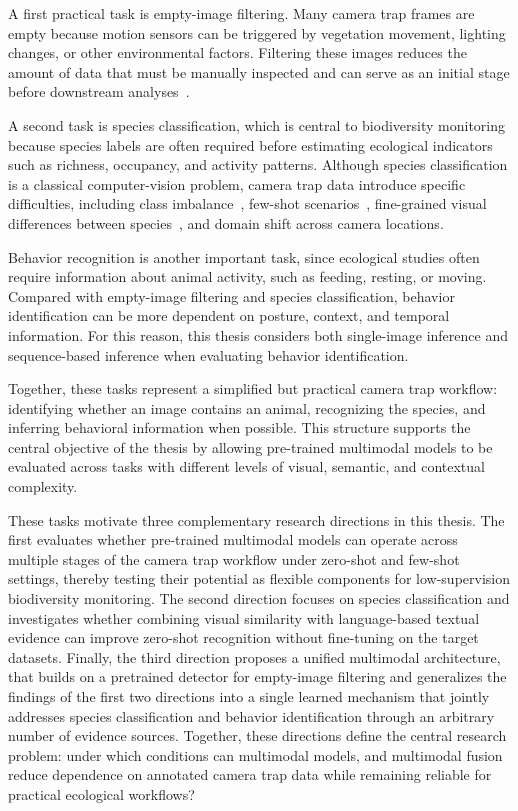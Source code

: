 A first practical task is empty-image filtering. Many camera trap frames are empty because motion sensors can be triggered by vegetation movement, lighting changes, or other environmental factors. Filtering these images reduces the amount of data that must be manually inspected and can serve as an initial stage before downstream analyses~\citep{beery2019efficient, gadot2024crop, velez2023evaluation, leorna2022human}.

A second task is species classification, which is central to biodiversity monitoring because species labels are often required before estimating ecological indicators such as richness, occupancy, and activity patterns. Although species classification is a classical computer-vision problem, camera trap data introduce specific difficulties, including class imbalance~\citep{schneider2020three, johnson2019survey, li2024deep}, few-shot scenarios~\citep{alencar2024zero}, fine-grained visual differences between species~\citep{van2017devil}, and domain shift across camera locations.

Behavior recognition is another important task, since ecological studies often require information about animal activity, such as feeding, resting, or moving. Compared with empty-image filtering and species classification, behavior identification can be more dependent on posture, context, and temporal information. For this reason, this thesis considers both single-image inference and sequence-based inference when evaluating behavior identification.

Together, these tasks represent a simplified but practical camera trap workflow: identifying whether an image contains an animal, recognizing the species, and inferring behavioral information when possible. This structure supports the central objective of the thesis by allowing pre-trained multimodal models to be evaluated across tasks with different levels of visual, semantic, and contextual complexity.

These tasks motivate three complementary research directions in this thesis. The first evaluates whether pre-trained multimodal models can operate across multiple stages of the camera trap workflow under zero-shot and few-shot settings, thereby testing their potential as flexible components for low-supervision biodiversity monitoring. The second direction focuses on species classification and investigates whether combining visual similarity with language-based textual evidence can improve zero-shot recognition without fine-tuning on the target datasets. Finally, the third direction proposes a unified multimodal architecture, that builds on a pretrained detector for empty-image filtering and generalizes the findings of the first two directions into a single learned mechanism that jointly addresses species classification and behavior identification through an arbitrary number of evidence sources. Together, these directions define the central research problem: under which conditions can multimodal models, and multimodal fusion reduce dependence on annotated camera trap data while remaining reliable for practical ecological workflows?


